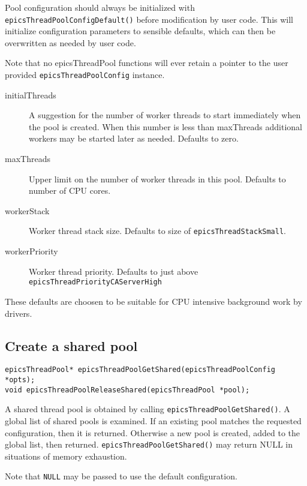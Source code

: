 
Pool configuration should always be initialized with \verb|epicsThreadPoolConfigDefault()|
before modification by user code. This will initialize configuration
parameters to sensible defaults, which can then be overwritten as
needed by user code.

Note that no epicsThreadPool functions will ever retain a pointer
to the user provided \verb|epicsThreadPoolConfig| instance.

\begin{description}
\item [{initialThreads}] A suggestion for the number of worker threads to start
immediately when the pool is created. When this number is less than
maxThreads additional workers may be started later as needed. Defaults to zero.
\item [{maxThreads}] Upper limit on the number of worker threads in this
pool. Defaults to number of CPU cores.
\item [{workerStack}] Worker thread stack size. Defaults to size of \verb|epicsThreadStackSmall|.
\item [{workerPriority}] Worker thread priority. Defaults to just above \verb|epicsThreadPriorityCAServerHigh|
\end{description}

These defaults are choosen to be suitable for CPU intensive background work by drivers.

\subsection{Create a shared pool}

\begin{verbatim}
epicsThreadPool* epicsThreadPoolGetShared(epicsThreadPoolConfig *opts);
void epicsThreadPoolReleaseShared(epicsThreadPool *pool);
\end{verbatim}


A shared thread pool is obtained by calling \verb|epicsThreadPoolGetShared()|.
A global list of shared pools is examined. If an existing pool matches
the requested configuration, then it is returned. Otherwise a new
pool is created, added to the global list, then returned. \verb|epicsThreadPoolGetShared()|
may return NULL in situations of memory exhaustion.

Note that \verb|NULL| may be passed to use the default configuration.

